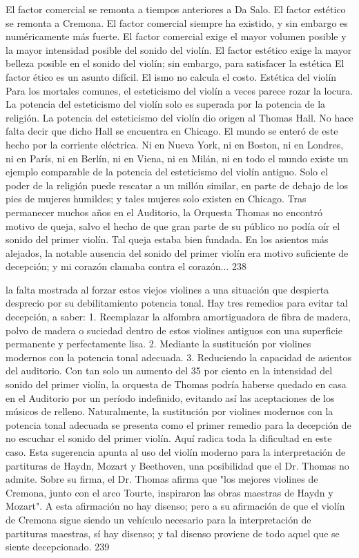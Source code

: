 El factor comercial se remonta a tiempos anteriores a Da Salo. El factor estético se remonta a Cremona. El factor comercial siempre ha existido, y sin embargo es numéricamente más fuerte. El factor comercial exige el mayor volumen posible y la mayor intensidad posible del sonido del violín. El factor estético exige la mayor belleza posible en el sonido del violín; sin embargo, para satisfacer la estética
El factor ético es un asunto difícil. El ismo no calcula el costo.	Estética del violín
Para los mortales comunes, el esteticismo del violín a veces parece rozar la locura. La potencia del esteticismo del violín solo es superada por la potencia de la religión. La potencia del esteticismo del violín dio origen al Thomas Hall. No hace falta decir que dicho Hall se encuentra en Chicago. El mundo se enteró de este hecho por la corriente eléctrica.
Ni en Nueva York, ni en Boston, ni en Londres, ni en París, ni en Berlín, ni en Viena, ni en Milán, ni en todo el mundo existe un ejemplo comparable de la potencia del esteticismo del violín antiguo.
Solo el poder de la religión puede rescatar a un millón similar, en parte de debajo de los pies de mujeres humildes; y tales mujeres solo existen en Chicago.
Tras permanecer muchos años en el Auditorio, la Orquesta Thomas no encontró motivo de queja, salvo el hecho de que gran parte de su público no podía oír el sonido del primer violín. Tal queja estaba bien fundada. En los asientos más alejados, la notable ausencia del sonido del primer violín era motivo suficiente de decepción; y mi corazón clamaba contra el corazón...
238

la falta mostrada al forzar estos viejos violines a una situación que despierta desprecio por su debilitamiento
potencia tonal. Hay tres remedios para evitar tal decepción, a saber: 1. Reemplazar la alfombra amortiguadora de fibra de madera, polvo de madera o suciedad dentro de estos violines antiguos con una superficie permanente y perfectamente lisa.
2. Mediante la sustitución por violines modernos con la potencia tonal adecuada.
3. Reduciendo la capacidad de asientos del auditorio.
Con tan solo un aumento del 35 por ciento en la intensidad del sonido del primer violín, la orquesta de Thomas podría haberse quedado en casa en el Auditorio por un período indefinido, evitando así las aceptaciones de los músicos de relleno.
Naturalmente, la sustitución por violines modernos con la potencia tonal adecuada se presenta como el primer remedio para la decepción de no escuchar el sonido del primer violín. Aquí radica toda la dificultad en este caso. Esta sugerencia apunta al uso del violín moderno para la interpretación de partituras de Haydn, Mozart y Beethoven, una posibilidad que el Dr. Thomas no admite. Sobre su firma, el Dr. Thomas afirma que "los mejores violines de Cremona, junto con el arco Tourte, inspiraron las obras maestras de Haydn y Mozart". A esta afirmación no hay disenso; pero a su afirmación de que el violín de Cremona sigue siendo un vehículo necesario para la interpretación de partituras maestras, sí hay disenso; y tal disenso proviene de todo aquel que se siente decepcionado.
239

